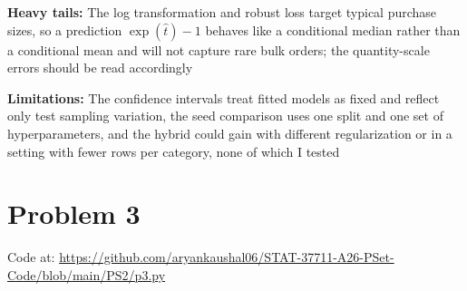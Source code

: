 \documentclass{article}
\begin{document}
\begin{enumerate}[label=\alph*.]
\textbf{Heavy tails:} The log transformation and robust loss target typical purchase sizes, so a prediction $\exp(\hat t)-1$ behaves like a conditional median rather than a conditional mean and will not capture rare bulk orders; the quantity-scale errors should be read accordingly

\textbf{Limitations:} The confidence intervals treat fitted models as fixed and reflect only test sampling variation, the seed comparison uses one split and one set of hyperparameters, and the hybrid could gain with different regularization or in a setting with fewer rows per category, none of which I tested
\end{enumerate}

\section*{Problem 3}
Code at: \url{https://github.com/aryankaushal06/STAT-37711-A26-PSet-Code/blob/main/PS2/p3.py}
\end{document}

